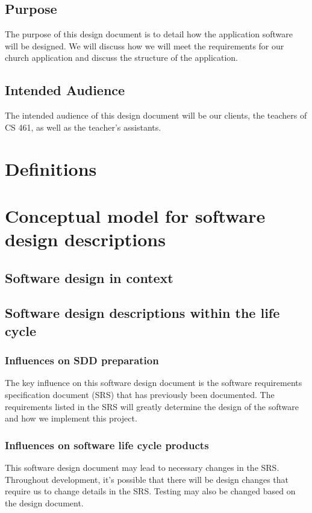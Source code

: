 \documentclass[letterpaper,10pt,draftclsnofoot,onecolumn,titlepage]{IEEEtran}
\begin{document}
		\subsection{Purpose}
			The purpose of this design document is to detail how the application software will be designed. 
			We will discuss how we will meet the requirements for our church application and discuss the structure of the application. 
		\subsection{Intended Audience}
			The intended audience of this design document will be our clients, the teachers of CS 461, as well as the teacher's assistants. 
	
		
	\section{Definitions}
	
	\section{Conceptual model for software design descriptions}
	
		\subsection{Software design in context}
		
		\subsection{Software design descriptions within the life cycle}
		
			\subsubsection{Influences on SDD preparation}
				The key influence on this software design document is the software requirements specification document (SRS) that has previously been documented. 
				The requirements listed in the SRS will greatly determine the design of the software and how we implement this project. 
			
			\subsubsection{Influences on software life cycle products}
				This software design document may lead to necessary changes in the SRS. 
				Throughout development, it's possible that there will be design changes that require us to change details in the SRS. 
				Testing may also be changed based on the design document. 
				
\end{document}
